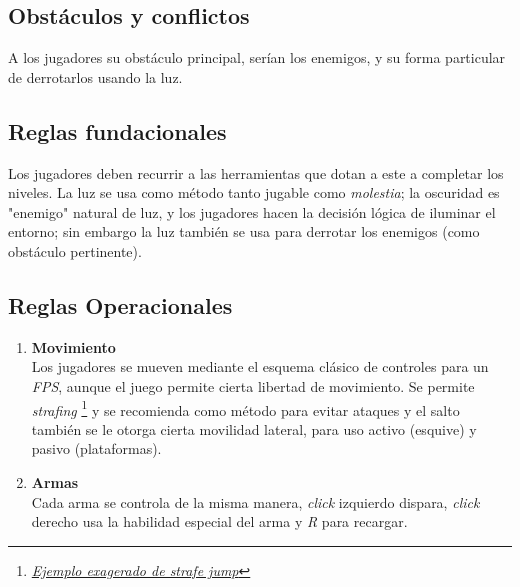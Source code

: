 \begin{multicols}{2}
        \subsection{Obstáculos y conflictos}
        A los jugadores su obstáculo principal, serían los enemigos, y su forma particular de derrotarlos usando la luz.
        \subsection{Reglas fundacionales}
        Los jugadores deben recurrir a las herramientas que dotan a este a completar los niveles. La luz se usa como método tanto jugable como \textit{molestia}; la oscuridad es "enemigo" natural de luz, y los jugadores hacen la decisión lógica de iluminar el entorno; sin embargo la luz también se usa para derrotar los enemigos (como obstáculo pertinente).
        \subsection{Reglas Operacionales}
        \begin{enumerate}[label=\alph*)]
            \item \textbf{Movimiento} \\
            Los jugadores se mueven mediante el esquema clásico de controles para un \textit{FPS}, aunque el juego permite cierta libertad de movimiento. Se permite \textit{strafing} \footnote{\href{https://www.youtube.com/watch?v=pUIqVz6qZLc}{\textit{Ejemplo exagerado de strafe jump}}} y se recomienda como método para evitar ataques y el salto también se le otorga cierta movilidad lateral, para uso activo (esquive) y pasivo (plataformas).
            \item \textbf{Armas} \\
            Cada arma se controla de la misma manera, \textit{click} izquierdo dispara, \textit{click} derecho usa la habilidad especial del arma y \textit{R} para recargar.
        \end{enumerate}


\end{multicols}
